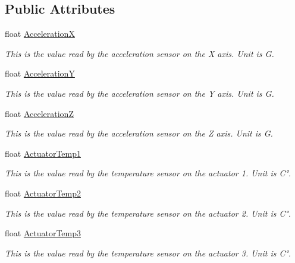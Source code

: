 \subsection*{Public Attributes}
\begin{DoxyCompactItemize}
\item 
float \hyperlink{structSensorsInfo_a3d4a04448cbb350ce537758ec9c38e51}{AccelerationX}
\begin{DoxyCompactList}\small\item\em This is the value read by the acceleration sensor on the X axis. Unit is G. \end{DoxyCompactList}\item 
float \hyperlink{structSensorsInfo_af8316a86022a11ef16181d5cbc6e266e}{AccelerationY}
\begin{DoxyCompactList}\small\item\em This is the value read by the acceleration sensor on the Y axis. Unit is G. \end{DoxyCompactList}\item 
float \hyperlink{structSensorsInfo_a98074de49d42dbb1b303e5e68e03cc90}{AccelerationZ}
\begin{DoxyCompactList}\small\item\em This is the value read by the acceleration sensor on the Z axis. Unit is G. \end{DoxyCompactList}\item 
float \hyperlink{structSensorsInfo_a9aa0da9e61455fd8b3faa91ad5970985}{Actuator\+Temp1}
\begin{DoxyCompactList}\small\item\em This is the value read by the temperature sensor on the actuator 1. Unit is C°. \end{DoxyCompactList}\item 
float \hyperlink{structSensorsInfo_abf182850e94b2bab72a282eb2a76be75}{Actuator\+Temp2}
\begin{DoxyCompactList}\small\item\em This is the value read by the temperature sensor on the actuator 2. Unit is C°. \end{DoxyCompactList}\item 
float \hyperlink{structSensorsInfo_aae8cdcf3e2412f99ec5cdc5a13db1528}{Actuator\+Temp3}
\begin{DoxyCompactList}\small\item\em This is the value read by the temperature sensor on the actuator 3. Unit is C°. \end{DoxyCompactList}\item 

\end{DoxyCompactItemize}
